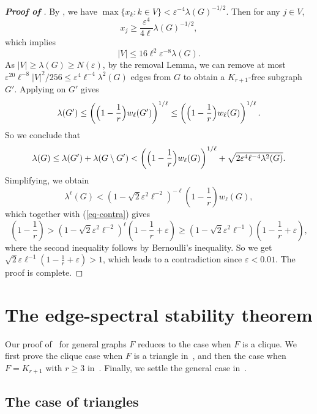 \documentclass[11pt,a4paper]{article}
\theoremstyle{definition}
\theoremstyle{remark}
\newcommand*{\abs}[1]{\lvert#1\rvert}
\begin{document}
\begin{proof}[{\bf Proof of }]
By , we have
$\max \{x_k:k \in V\} < \varepsilon^{-4} \lambda(G)^{-1/2}$. 
Then for any $j \in V$, 
$$x_j \geq \frac{\varepsilon^4}{4\ell} \lambda(G)^{-1/2},$$
which implies
$$\abs{V} \leq 16\ell^2 \varepsilon^{-8} \lambda(G).$$
As $|V|\ge\lambda(G)\ge N(\varepsilon)$, by the removal Lemma, we can remove at most $\varepsilon^{20}\ell^{-8} \abs{V}^2/256 \leq \varepsilon^4 \ell^{-4}\lambda^2(G)$ edges from $G$ to obtain a $K_{r+1}$-free subgraph $G'$. 
Applying  on $G'$ gives 
$$\lambda(G') \leq \left(\Bigl(1-\frac{1}{r}\Bigr) w_{\ell}(G')\right)^{1/\ell} \leq \left(\Bigl(1-\frac{1}{r}\Bigr) w_{\ell}(G)\right)^{1/\ell}.$$
So we conclude that
\[ \lambda(G) \le \lambda(G') + \lambda(G\setminus G') <\left(\Bigl(1-\frac{1}{r}\Bigr) w_{\ell}(G)\right)^{1/\ell} + \sqrt{2\varepsilon^4 \ell^{-4} \lambda^2(G)}. \]  
Simplifying, we obtain
\[  \lambda^{\ell} (G) < \left(1- \sqrt{2} \varepsilon^2\ell^{-2} \right)^{-\ell} 
 \left(1-\frac{1}{r}\right) w_{\ell}(G), \]
which together with (\ref{eq-contra}) gives 
\[  \left(1- \frac{1}{r} \right)  > \left(1- \sqrt{2} \varepsilon^2\ell^{-2} \right)^{\ell} \left(1-\frac{1}{r} + \varepsilon\right) \ge 
\left(1- \sqrt{2}\varepsilon^2\ell^{-1}\right) \left(1-\frac{1}{r} + \varepsilon\right), \]
where the second inequality follows by Bernoulli's inequality. 
So we get $ \sqrt{2}\varepsilon \ell^{-1}(1-\frac{1}{r}+\varepsilon)>1$, which leads to a contradiction since $\varepsilon< 0.01$.  
The proof is complete. 
\end{proof}









\section{The edge-spectral stability theorem}
\label{sec:edge-stability} 


Our proof of~ for general graphs $F$ reduces to the case when $F$ is a clique. We first prove the clique case when $F$ is a triangle in~,  and then the case when $F=K_{r+1}$ with $r\ge 3$  in~. Finally, we settle the general case in~.


\subsection{The case of triangles}\label{sec:F-triangle}
\end{document}
